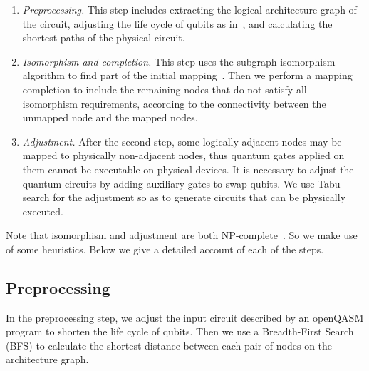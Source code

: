 \documentclass[runningheads]{llncs}
\begin{document}
\begin{enumerate}
	\item \emph{Preprocessing.} 
	This step includes extracting the logical architecture graph of the circuit, adjusting the life cycle of qubits as in~\cite{2019Zhang},  and calculating the shortest paths of the physical circuit.
	\item \emph{Isomorphism and completion.} %
	This step uses the subgraph isomorphism algorithm to find part of the initial mapping~\cite{Sun2020}.
	Then we perform a mapping completion to include the remaining nodes that do not satisfy all isomorphism requirements, according to the connectivity between the unmapped node and the mapped nodes.
      \item \emph{Adjustment.} %
        After the second step, some logically adjacent nodes may be mapped to physically non-adjacent nodes, thus quantum gates applied on them cannot be executable on physical devices. It is necessary to adjust the quantum circuits by adding auxiliary gates to swap qubits. We use Tabu search for the adjustment so as to generate circuits that can be physically executed.
\end{enumerate}
Note that isomorphism and adjustment are both NP-complete~\cite{2018QubitSiraichi}. So we make use of some heuristics. Below we give a detailed account of each of the steps.

\subsection{Preprocessing}
In the preprocessing step, we adjust the input circuit described by an openQASM program to shorten the life cycle of qubits. Then we use a Breadth-First Search (BFS) to calculate the shortest distance between each pair of nodes on the architecture graph.
\end{document}
